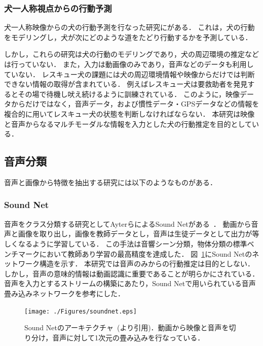\subsubsection{犬一人称視点からの行動予測}
犬一人称映像からの犬の行動予測を行なった研究に\cite{whoretthedog}がある．
これは，犬の行動をモデリングし，犬が次にどのような道をたどり行動するかを予測している．

しかし，これらの研究は犬の行動のモデリングであり，犬の周辺環境の推定などは行っていない．
また，入力は動画像のみであり，音声などのデータも利用していない．
レスキュー犬の課題には犬の周辺環境情報や映像からだけでは判断できない情報の取得が含まれている．
例えばレスキュー犬は要救助者を発見するとその場で待機し吠え続けるように訓練されている．
このように，映像データからだけではなく，音声データ，および慣性データ・GPSデータなどの情報を複合的に用いてレスキュー犬の状態を判断しなければならない．
本研究は映像と音声からなるマルチモーダルな情報を入力とした犬の行動推定を目的としている． 


\subsection{音声分類}
音声と画像から特徴を抽出する研究には以下のようなものがある．
\subsubsection{Sound Net}
音声をクラス分類する研究としてAyterらによるSound Netがある~\cite{aytar2016soundnet}．
動画から音声と画像を取り出し，画像を教師データとし，音声は生徒データとして出力が等しくなるように学習している．
この手法は音響シーン分類，物体分類の標準ベンチマークにおいて教師あり学習の最高精度を達成した．
図~\ref{soundnet_network}にSound Netのネットワーク構造を示す．
本研究では音声のみからの行動推定は目的としない．しかし，音声の意味的情報は動画認識に重要であることが明らかにされている．
音声を入力とするストリームの構築にあたり，Sound Netで用いられている音声畳み込みネットワークを参考にした．
\begin{figure}[htbp]
 \begin{center}
  \texttt{[image: ./Figures/soundnet.eps]}
  \caption{Sound Netのアーキテクチャ~(\cite{aytar2016soundnet}より引用)．動画から映像と音声を切り分け，音声に対して1次元の畳み込みを行なっている．}
  \label{soundnet_network}
 \end{center}
\end{figure}

